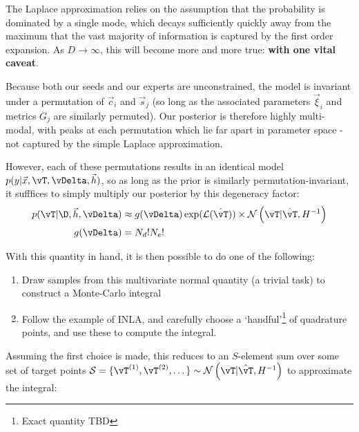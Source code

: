         \begin{aside}[Degeneracy]
            The Laplace approximation relies on the assumption that the probability is dominated by a single mode, which decays sufficiently quickly away from the maximum that the vast majority of information is captured by the first order expansion. As $D \to \infty$, this will become more and more true: \textbf{with one vital caveat}. 

            Because both our seeds and our experts are unconstrained, the model is invariant under a permutation of $\vec{c}_i$ and $\vec{s}_j$ (so long as the associated parameters $\vec{\xi}_i$ and metrics $G_j$ are similarly permuted).  Our posterior is therefore highly multi-modal, with peaks at each permutation which lie far apart in parameter space - not captured by the simple Laplace approximation. 

            However, each of these permutations results in an identical model $ p(y | \vec{x}, \vT,\vDelta,\vec{h})$, so as long as the prior is similarly permutation-invariant, it sufffices to simply multiply our posterior by this degeneracy factor:
             \begin{align}
                 p(\vT | \D,\vec{h},\vDelta) & \approx  g(\vDelta) \exp(\mathcal{L}(\hat{\vT})) \times \mathcal{N}\left(\vT | \hat{\vT}, H^{-1} \right)
                  \\
                  g(\vDelta) & = N_d! N_e!
             \end{align}
        \end{aside}

        With this quantity in hand, it is then possible to do one of the following:
        \begin{enumerate}
            \item Draw samples from this multivariate normal quantity (a trivial task) to construct a Monte-Carlo integral
            \item Follow the example of INLA, and carefully choose a `handful'\footnote{Exact quantity TBD} of quadrature points, and use these to compute the integral.
        \end{enumerate}

        Assuming the first choice is made, this reduces to an $S$-element sum over some set of target points $\mathcal{S}= \{\vT^{(1)},\vT^{(2)},\dots\} \sim  \mathcal{N}\left(\vT | \hat{\vT}, H^{-1} \right) $ to approximate the integral:     
        
